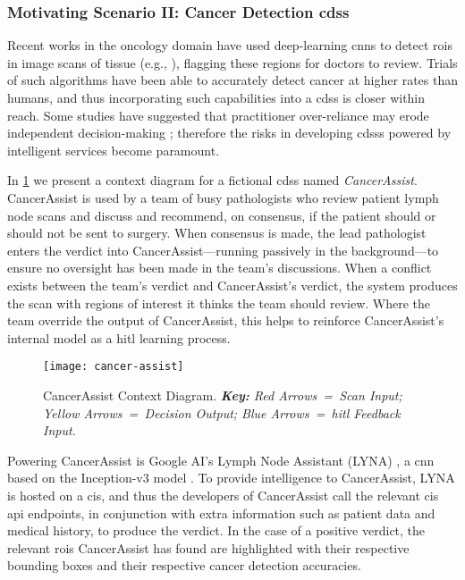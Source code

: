 
\subsubsection{Motivating Scenario II: Cancer Detection \gls{cdss}}
\label{ssec:introduction:motivation:scenario:cancer}

Recent works in the oncology domain have used deep-learning \glspl{cnn} to detect \glspl{roi} in image scans of tissue (e.g., \citep{Liu:2018fa,Haenssle:2018bz,EhteshamiBejnordi:2017kq}), flagging these regions for doctors to review. Trials of such algorithms have been able to accurately detect cancer at higher rates than humans, and thus incorporating such capabilities into a \gls{cdss} is closer within reach. Some studies have suggested that practitioner over-reliance may erode independent decision-making \citep{Jaspers:2011hy,Chambers:1991uh}; therefore the risks in developing \glspl{cdss} powered by intelligent services become paramount.

In \cref{fig:introduction:motivation:scenario:cancer} we present a context diagram for a fictional \gls{cdss} named \textit{CancerAssist}. CancerAssist is used by a team of busy pathologists who review patient lymph node scans and discuss and recommend, on consensus, if the patient should or should not be sent to surgery. When consensus is made, the lead pathologist enters the verdict into CancerAssist---running passively in the background---to ensure no oversight has been made in the team's discussions. When a conflict exists between the team's verdict and CancerAssist's verdict, the system produces the scan with regions of interest it thinks the team should review. Where the team override the output of CancerAssist, this helps to reinforce CancerAssist's internal model as a \gls{hitl} learning process.

\begin{figure}[th]
\centering
  \texttt{[image: cancer-assist]}
  \caption[CancerAssist Context Diagram]{CancerAssist Context Diagram. \textit{\textbf{Key:} Red Arrows~=~Scan Input; Yellow Arrows~=~Decision Output; Blue Arrows~=~\gls{hitl} Feedback Input.}}
  \label{fig:introduction:motivation:scenario:cancer}
\end{figure}

Powering CancerAssist is Google AI's Lymph Node Assistant (LYNA) \citep{Liu:2018fa}, a \gls{cnn} based on the Inception-v3 model \citep{Szegedy:2016ws,Krizhevsky:2012wl}. To provide intelligence to CancerAssist, LYNA is hosted on a \gls{cis}, and thus the developers of CancerAssist call the relevant \gls{cis} \gls{api} endpoints, in conjunction with extra information such as patient data and medical history, to produce the verdict. In the case of a positive verdict, the relevant \glspl{roi} CancerAssist has found are highlighted with their respective bounding boxes and their respective cancer detection accuracies.

